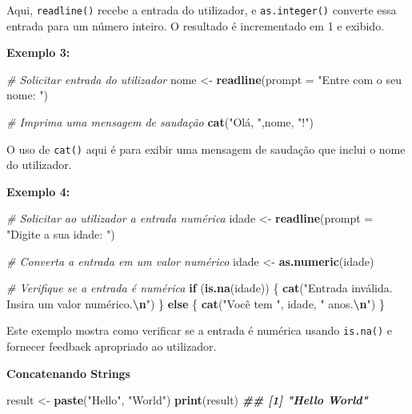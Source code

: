 \documentclass[
]{book}
\newenvironment{Shaded}{\begin{snugshade}}{\end{snugshade}}
\newcommand{\AttributeTok}[1]{\textcolor[rgb]{0.13,0.29,0.53}{#1}}
\newcommand{\CommentTok}[1]{\textcolor[rgb]{0.56,0.35,0.01}{\textit{#1}}}
\newcommand{\ControlFlowTok}[1]{\textcolor[rgb]{0.13,0.29,0.53}{\textbf{#1}}}
\newcommand{\DocumentationTok}[1]{\textcolor[rgb]{0.56,0.35,0.01}{\textbf{\textit{#1}}}}
\newcommand{\FunctionTok}[1]{\textcolor[rgb]{0.13,0.29,0.53}{\textbf{#1}}}
\newcommand{\NormalTok}[1]{#1}
\newcommand{\OtherTok}[1]{\textcolor[rgb]{0.56,0.35,0.01}{#1}}
\newcommand{\SpecialCharTok}[1]{\textcolor[rgb]{0.81,0.36,0.00}{\textbf{#1}}}
\newcommand{\StringTok}[1]{\textcolor[rgb]{0.31,0.60,0.02}{#1}}
\begin{document}
Aqui, \texttt{readline()} recebe a entrada do utilizador, e \texttt{as.integer()}
converte essa entrada para um número inteiro. O resultado é incrementado
em 1 e exibido.

\textbf{Exemplo 3:}

\begin{Shaded}
\begin{Highlighting}[]
\CommentTok{\# Solicitar entrada do utilizador}
\NormalTok{nome }\OtherTok{\textless{}{-}} \FunctionTok{readline}\NormalTok{(}\AttributeTok{prompt =} \StringTok{"Entre com o seu nome: "}\NormalTok{)}
    
\CommentTok{\# Imprima uma mensagem de saudação}
\FunctionTok{cat}\NormalTok{(}\StringTok{"Olá, "}\NormalTok{,nome, }\StringTok{"!"}\NormalTok{)}
\end{Highlighting}
\end{Shaded}

O uso de \texttt{cat()} aqui é para exibir uma mensagem de saudação que inclui
o nome do utilizador.

\textbf{Exemplo 4:}

\begin{Shaded}
\begin{Highlighting}[]
\CommentTok{\# Solicitar ao utilizador a entrada numérica}
\NormalTok{idade }\OtherTok{\textless{}{-}} \FunctionTok{readline}\NormalTok{(}\AttributeTok{prompt =} \StringTok{"Digite a sua idade: "}\NormalTok{)}
    
\CommentTok{\# Converta a entrada em um valor numérico}
\NormalTok{idade }\OtherTok{\textless{}{-}} \FunctionTok{as.numeric}\NormalTok{(idade)}
    
\CommentTok{\# Verifique se a entrada é numérica}
\ControlFlowTok{if}\NormalTok{ (}\FunctionTok{is.na}\NormalTok{(idade)) \{}
\FunctionTok{cat}\NormalTok{(}\StringTok{"Entrada inválida. Insira um valor numérico.}\SpecialCharTok{\textbackslash{}n}\StringTok{"}\NormalTok{)}
\NormalTok{\} }\ControlFlowTok{else}\NormalTok{ \{}
  \FunctionTok{cat}\NormalTok{(}\StringTok{"Você tem "}\NormalTok{, idade, }\StringTok{" anos.}\SpecialCharTok{\textbackslash{}n}\StringTok{"}\NormalTok{)}
\NormalTok{\}}
\end{Highlighting}
\end{Shaded}

Este exemplo mostra como verificar se a entrada é numérica usando
\texttt{is.na()} e fornecer feedback apropriado ao utilizador.

\textbf{Concatenando Strings}

\begin{Shaded}
\begin{Highlighting}[]
\NormalTok{result }\OtherTok{\textless{}{-}} \FunctionTok{paste}\NormalTok{(}\StringTok{"Hello"}\NormalTok{, }\StringTok{"World"}\NormalTok{)}
\FunctionTok{print}\NormalTok{(result)}
\DocumentationTok{\#\# [1] "Hello World"}
\end{Highlighting}
\end{Shaded}
\end{document}
